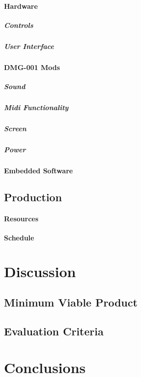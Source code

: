 \documentclass[]{article}
\begin{document}
        \paragraph{Hardware}
            \subparagraph{Controls}
            \subparagraph{User Interface}
        \paragraph{DMG-001 Mods}
            \subparagraph{Sound}
            \subparagraph{Midi Functionality}
            \subparagraph{Screen}
            \subparagraph{Power}
        \paragraph{Embedded Software}
    \subsection{Production}
        \paragraph{Resources}
        \paragraph{Schedule}

\section{Discussion}
    \subsection{Minimum Viable Product}
    \subsection{Evaluation Criteria}

\section{Conclusions}
\end{document}

